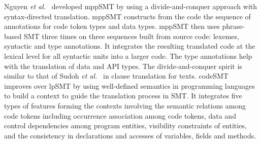 Nguyen {\em et al.}~\cite{ase15} developed mppSMT by using a
divide-and-conquer approach with syntax-directed translation. mppSMT
constructs from the code the sequence of annotations for code token
types and data types. mppSMT then uses phrase-based SMT three times on
three sequences built from source code: lexemes, syntactic and type
annotations. It integrates the resulting translated code at the
lexical level for all syntactic units into a larger code. The type
annotations help with the translation of data and API types.
The divide-and-conquer spirit is similar to that of Sudoh {\em et
  al.}~\cite{sudoh15} in clause translation for texts.
%
codeSMT~\cite{icsme16} improves over lpSMT by using well-defined
semantics in programming languages to build a context to guide the
translation process in SMT. It integrates five types of features
forming the contexts involving the semantic relations among code
tokens including occurrence association among code tokens, data and
control dependencies among program entities, visibility constraints of
entities, and the consistency in declarations and accesses of
variables, fields and methods.







